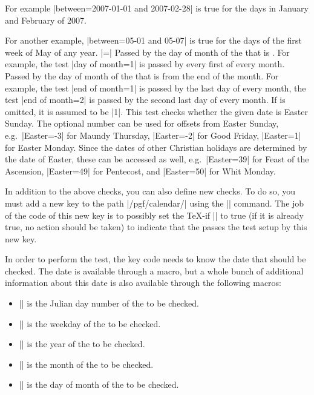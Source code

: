 \begin{command}{\pgfcalendarifdate{}}
\begin{itemize}
            For example |between=2007-01-01 and 2007-02-28| is true for the
            days in January and February of 2007.

            For another example, |between=05-01 and 05-07| is true for the days
            of the first week of May of any year.
        |=| Passed by the day of
            month of the  that is . For example, the
            test |day of month=1| is passed by every first of every month.
         Passed by the
            day of month of the  that is  from the end
            of the month. For example, the test |end of month=1| is passed by
            the last day of every month, the test |end of month=2| is passed by
            the second last day of every month. If  is omitted, it
            is assumed to be |1|.
         This test checks
            whether the given date is Easter Sunday.  The optional number can
            be used for offsets from Easter Sunday, e.g.\ |Easter=-3| for
            Maundy Thursday, |Easter=-2| for Good Friday, |Easter=1| for Easter
            Monday.  Since the dates of other Christian holidays are determined
            by the date of Easter, these can be accessed as well, e.g.\
            |Easter=39| for Feast of the Ascension, |Easter=49| for Pentecost,
            and |Easter=50| for Whit Monday.
    \end{itemize}

    In addition to the above checks, you can also define new checks. To do so,
    you must add a new key to the path |/pgf/calendar/| using the |\pgfkeys|
    command. The job of the code of this new key is to possibly set the \TeX-if
    |\ifpgfcalendarmatches| to true (if it is already true, no action should be
    taken) to indicate that the \meta{date} passes the test setup by this new
    key.

    In order to perform the test, the key code needs to know the date that
    should be checked. The date is available through a macro, but a whole bunch
    of additional information about this date is also available through the
    following macros:
    \begin{itemize}
        \item |\pgfcalendarifdatejulian| is the Julian day number of the
            \meta{date} to be checked.
        \item |\pgfcalendarifdateweekday| is the weekday of the  to
            be checked.
        \item |\pgfcalendarifdateyear| is the year of the  to be
            checked.
        \item |\pgfcalendarifdatemonth| is the month of the  to be
            checked.
        \item |\pgfcalendarifdateday| is the day of month of the  to
            be checked.
    \end{itemize}


\end{command}
